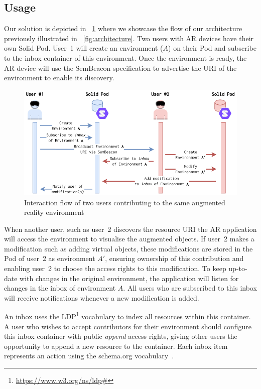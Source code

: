 \subsection{Usage} \label{subsec:usage}
Our solution is depicted in \figurename~\ref{fig:flow} where we showcase the flow of our architecture previously illustrated in \figurename~\ref{fig:architecture}. Two users with AR devices have their own Solid Pod. User~1 will create an environment ($A$) on their Pod and subscribe to the inbox container of this environment. Once the environment is ready, the AR device will use the SemBeacon specification to advertise the URI of the environment to enable its discovery.

\begin{figure}[htb]
\centering
\includegraphics[scale=0.90]{images/flow.pdf}
\caption{Interaction flow of two users contributing to the same augmented reality environment} \label{fig:flow}
\end{figure}

When another user, such as user~2 discovers the resource URI the AR application will access the environment to visualise the augmented objects. If user~2 makes a modification such as adding virtual objects, these modifications are stored in the Pod of user~2 as environment $A'$, ensuring ownership of this contribution and enabling user~2 to choose the access rights to this modification. To keep up-to-date with changes in the original environment, the application will listen for changes in the inbox of environment $A$. All users who are subscribed to this inbox will receive notifications whenever a new modification is added.

An inbox uses the LDP\footnote{\url{https://www.w3.org/ns/ldp\#}} vocabulary to index all resources within this container. A user who wishes to accept contributors for their environment should configure this inbox container with public \textit{append} access rights, giving other users the opportunity to append a new resource to the container. Each inbox item represents an action using the \mbox{schema.org} vocabulary~\cite{10.1002/asi.24744}.


